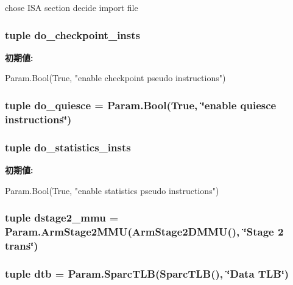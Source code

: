 chose ISA section decide import file \hypertarget{classBaseCPU_a6f7595c08ddf31d6a8646b0e14b28c46}{
\subsubsection[{do\_\-checkpoint\_\-insts}]{\setlength{\rightskip}{0pt plus 5cm}tuple {\bf do\_\-checkpoint\_\-insts}}}
\label{classBaseCPU_a6f7595c08ddf31d6a8646b0e14b28c46}
{\bfseries 初期値:}
\begin{DoxyCode}
Param.Bool(True,
        "enable checkpoint pseudo instructions")
\end{DoxyCode}
\hypertarget{classBaseCPU_aa517e445b968db5f6e09649460450220}{
\subsubsection[{do\_\-quiesce}]{\setlength{\rightskip}{0pt plus 5cm}tuple {\bf do\_\-quiesce} = Param.Bool(True, \char`\"{}enable quiesce instructions\char`\"{})}}
\label{classBaseCPU_aa517e445b968db5f6e09649460450220}
\hypertarget{classBaseCPU_a110e001546710f99adde87d1746e9c49}{
\subsubsection[{do\_\-statistics\_\-insts}]{\setlength{\rightskip}{0pt plus 5cm}tuple {\bf do\_\-statistics\_\-insts}}}
\label{classBaseCPU_a110e001546710f99adde87d1746e9c49}
{\bfseries 初期値:}
\begin{DoxyCode}
Param.Bool(True,
        "enable statistics pseudo instructions")
\end{DoxyCode}
\hypertarget{classBaseCPU_a75d388d574fc0e0122be1d7167cba0d3}{
\subsubsection[{dstage2\_\-mmu}]{\setlength{\rightskip}{0pt plus 5cm}tuple {\bf dstage2\_\-mmu} = Param.ArmStage2MMU(ArmStage2DMMU(), \char`\"{}Stage 2 trans\char`\"{})}}
\label{classBaseCPU_a75d388d574fc0e0122be1d7167cba0d3}
\hypertarget{classBaseCPU_a6be3ef152e982fb57e224c4a32a431b7}{
\subsubsection[{dtb}]{\setlength{\rightskip}{0pt plus 5cm}tuple {\bf dtb} = Param.SparcTLB(SparcTLB(), \char`\"{}Data TLB\char`\"{})}}
\label{classBaseCPU_a6be3ef152e982fb57e224c4a32a431b7}


